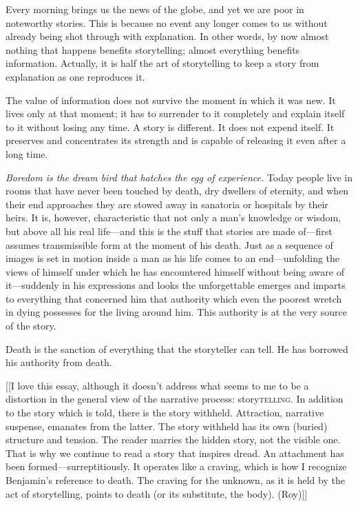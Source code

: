 \documentclass[
]{memoir}
\begin{document}
Every morning brings us the news of the globe, and yet we are poor in
noteworthy stories. This is because no event any longer comes to us
without already being shot through with explanation. In other words, by
now almost nothing that happens benefits storytelling; almost everything
benefits information. Actually, it is half the art of storytelling to
keep a story from explanation as one reproduces it.

The value of information does not survive the moment in which it was
new. It lives only at that moment; it has to surrender to it completely
and explain itself to it without losing any time. A story is different.
It does not expend itself. It preserves and concentrates its strength
and is capable of releasing it even after a long time.

\emph{Boredom is the dream bird that hatches the egg of experience.}
Today people live in rooms that have never been touched by death, dry
dwellers of eternity, and when their end approaches they are stowed away
in sanatoria or hospitals by their heirs. It is, however, characteristic
that not only a man's knowledge or wisdom, but above all his real
life---and this is the stuff that stories are made of---first assumes
transmissible form at the moment of his death. Just as a sequence of
images is set in motion inside a man as his life comes to an
end---unfolding the views of himself under which he has encountered
himself without being aware of it---suddenly in his expressions and
looks the unforgettable emerges and imparts to everything that concerned
him that authority which even the poorest wretch in dying possesses for
the living around him. This authority is at the very source of the
story.

Death is the sanction of everything that the storyteller can tell. He
has borrowed his authority from death.

{[}{[}I love this essay, although it doesn't address what seems to me to
be a distortion in the general view of the narrative process:
story\textsc{telling}. In addition to the story which is told, there is
the story withheld. Attraction, narrative suspense, emanates from the
latter. The story withheld has its own (buried) structure and tension.
The reader marries the hidden story, not the visible one. That is why we
continue to read a story that inspires dread. An attachment has been
formed---surreptitiously. It operates like a craving, which is how I
recognize Benjamin's reference to death. The craving for the unknown, as
it is held by the act of storytelling, points to death (or its
substitute, the body). (Roy){]}{]}
\end{document}
